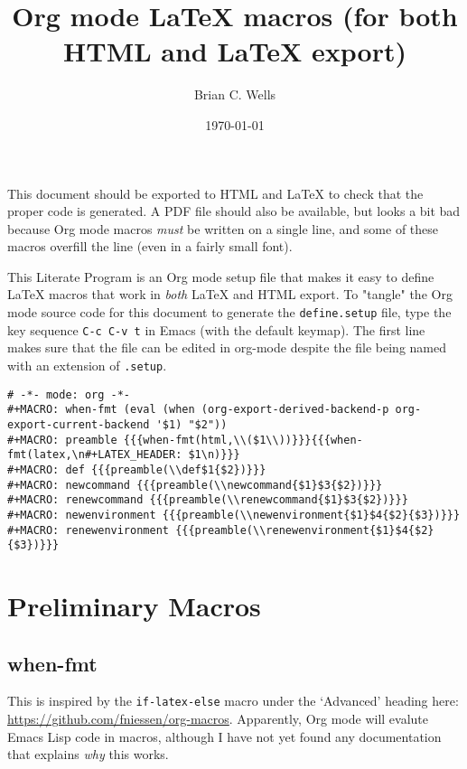 \documentclass[11pt]{article}
\author{Brian C. Wells}
\date{\today}
\title{Org mode \LaTeX{} macros (for both HTML and \LaTeX{} export)}
\begin{document}
\maketitle
\tableofcontents

This document should be exported to HTML and \LaTeX{} to check that the
proper code is generated.  A PDF file should also be available, but
looks a bit bad because Org mode macros \emph{must} be written on a single
line, and some of these macros overfill the line (even in a fairly
small font).

This Literate Program is an Org mode setup file that makes it easy to
define \LaTeX{} macros that work in \emph{both} \LaTeX{} and HTML export.  To
"tangle" the Org mode source code for this document to generate the
\verb~define.setup~ file, type the key sequence \verb~C-c C-v t~ in Emacs (with
the default keymap).  The first line makes sure that the file can be
edited in org-mode despite the file being named with an extension of
\verb~.setup~.

\begin{verbatim}
# -*- mode: org -*-
#+MACRO: when-fmt (eval (when (org-export-derived-backend-p org-export-current-backend '$1) "$2"))
#+MACRO: preamble {{{when-fmt(html,\\($1\\))}}}{{{when-fmt(latex,\n#+LATEX_HEADER: $1\n)}}}
#+MACRO: def {{{preamble(\\def$1{$2})}}}
#+MACRO: newcommand {{{preamble(\\newcommand{$1}$3{$2})}}}
#+MACRO: renewcommand {{{preamble(\\renewcommand{$1}$3{$2})}}}
#+MACRO: newenvironment {{{preamble(\\newenvironment{$1}$4{$2}{$3})}}}
#+MACRO: renewenvironment {{{preamble(\\renewenvironment{$1}$4{$2}{$3})}}}
\end{verbatim}

\section{Preliminary Macros}
\label{sec-1}

\subsection{when-fmt}
\label{sec-1-1}

This is inspired by the \verb~if-latex-else~ macro under the `Advanced'
heading here: \url{https://github.com/fniessen/org-macros}. Apparently,
Org mode will evalute Emacs Lisp code in macros, although I have not
yet found any documentation that explains \emph{why} this works.
\end{document}
